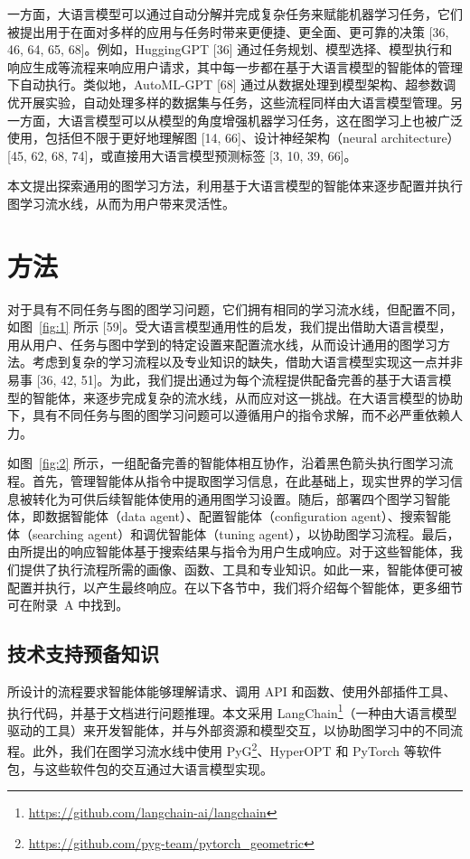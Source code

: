 \documentclass[11pt,UTF8,fontset=fandol]{ctexart}
\begin{document}
一方面，大语言模型可以通过自动分解并完成复杂任务来赋能机器学习任务，它们被提出用于在面对多样的应用与任务时带来更便捷、更全面、更可靠的决策 [36, 46, 64, 65, 68]。例如，HuggingGPT [36] 通过任务规划、模型选择、模型执行和响应生成等流程来响应用户请求，其中每一步都在基于大语言模型的智能体的管理下自动执行。类似地，AutoML-GPT [68] 通过从数据处理到模型架构、超参数调优开展实验，自动处理多样的数据集与任务，这些流程同样由大语言模型管理。另一方面，大语言模型可以从模型的角度增强机器学习任务，这在图学习上也被广泛使用，包括但不限于更好地理解图 [14, 66]、设计神经架构（neural architecture）[45, 62, 68, 74]，或直接用大语言模型预测标签 [3, 10, 39, 66]。

本文提出探索通用的图学习方法，利用基于大语言模型的智能体来逐步配置并执行图学习流水线，从而为用户带来灵活性。

\section{方法}

对于具有不同任务与图的图学习问题，它们拥有相同的学习流水线，但配置不同，如图~\ref{fig:1} 所示 [59]。受大语言模型通用性的启发，我们提出借助大语言模型，用从用户、任务与图中学到的特定设置来配置流水线，从而设计通用的图学习方法。考虑到复杂的学习流程以及专业知识的缺失，借助大语言模型实现这一点并非易事 [36, 42, 51]。为此，我们提出通过为每个流程提供配备完善的基于大语言模型的智能体，来逐步完成复杂的流水线，从而应对这一挑战。在大语言模型的协助下，具有不同任务与图的图学习问题可以遵循用户的指令求解，而不必严重依赖人力。

如图~\ref{fig:2} 所示，一组配备完善的智能体相互协作，沿着黑色箭头执行图学习流程。首先，管理智能体从指令中提取图学习信息，在此基础上，现实世界的学习信息被转化为可供后续智能体使用的通用图学习设置。随后，部署四个图学习智能体，即数据智能体（data agent）、配置智能体（configuration agent）、搜索智能体（searching agent）和调优智能体（tuning agent），以协助图学习流程。最后，由所提出的响应智能体基于搜索结果与指令为用户生成响应。对于这些智能体，我们提供了执行流程所需的画像、函数、工具和专业知识。如此一来，智能体便可被配置并执行，以产生最终响应。在以下各节中，我们将介绍每个智能体，更多细节可在附录~A 中找到。

\subsection{技术支持预备知识}

所设计的流程要求智能体能够理解请求、调用 API 和函数、使用外部插件工具、执行代码，并基于文档进行问题推理。本文采用 LangChain\footnote{\url{https://github.com/langchain-ai/langchain}}（一种由大语言模型驱动的工具）来开发智能体，并与外部资源和模型交互，以协助图学习中的不同流程。此外，我们在图学习流水线中使用 PyG\footnote{\url{https://github.com/pyg-team/pytorch_geometric}}、HyperOPT 和 PyTorch 等软件包，与这些软件包的交互通过大语言模型实现。
\end{document}
